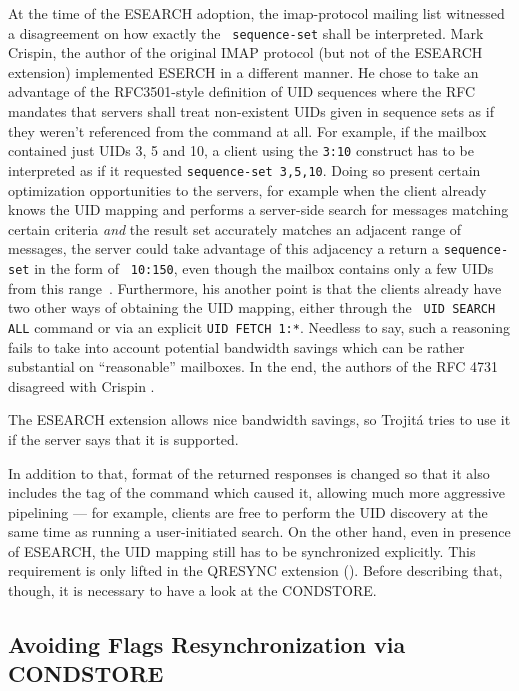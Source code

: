 \documentclass[trojita]{subfiles}
\begin{document}
At the time of the ESEARCH adoption, the imap-protocol mailing list witnessed a disagreement on how exactly the {\tt
sequence-set} shall be interpreted.  Mark Crispin, the author of the original IMAP protocol (but not of the ESEARCH
extension) implemented ESERCH in a different manner.  He chose to take an advantage of the RFC3501-style definition of
UID sequences where the RFC mandates that servers shall treat non-existent UIDs given in sequence sets as if they
weren't referenced from the command at all.  For example, if the mailbox contained just UIDs 3, 5 and 10, a client using
the {\tt 3:10} construct has to be interpreted as if it requested {\tt sequence-set 3,5,10}.  Doing so present certain
optimization opportunities to the servers, for example when the client already knows the UID mapping and performs a
server-side search for messages matching certain criteria {\em and} the result set accurately matches an adjacent range
of messages, the server could take advantage of this adjacency a return a {\tt sequence-set} in the form of {\tt
10:150}, even though the mailbox contains only a few UIDs from this range~\cite{crispin-esearch-flawed}.  Furthermore,
his another point is that the clients already have two other ways of obtaining the UID mapping, either through the {\tt
UID SEARCH ALL} command or via an explicit {\tt UID FETCH 1:*}.  Needless to say, such a reasoning fails to take into
account potential bandwidth savings which can be rather substantial on ``reasonable'' mailboxes.  In the end, the
authors of the RFC 4731 disagreed with Crispin \cite{melnikov-esearch-interpretation}
\cite{cridland-esearch-interpretation}.

\begin{trojitabehavior}
The ESEARCH extension allows nice bandwidth savings, so Trojitá tries to use it if the server says that it is supported.
\end{trojitabehavior}

In addition to that, format of the returned responses is changed so that it also includes the tag of the command which
caused it, allowing much more aggressive pipelining --- for example, clients are free to perform the UID discovery at the
same time as running a user-initiated search.  On the other hand, even in presence of ESEARCH, the UID mapping still has
to be synchronized explicitly.  This requirement is only lifted in the QRESYNC extension
().  Before describing that, though, it is necessary to have a look at the CONDSTORE.

\subsection{Avoiding Flags Resynchronization via CONDSTORE}
\end{document}

